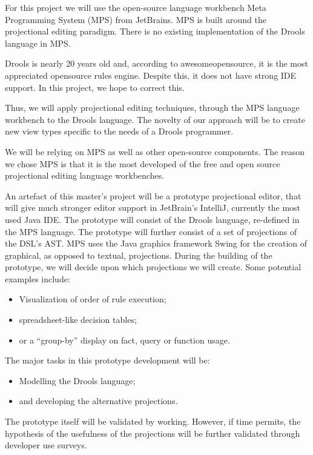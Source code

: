 For this project we will use the open-source language workbench Meta Programming System (MPS) from JetBrains\cite{MPS_ProductPage}.
MPS is built around the projectional editing paradigm.
There is no existing implementation of the Drools language in MPS.

Drools is nearly 20 years old and, according to awesomeopensource\cite{awesomeopensource}, it is the most appreciated opensource rules engine.
Despite this, it does not have strong IDE support.
In this project, we hope to correct this.

Thus, we will apply projectional editing techniques, through the MPS language workbench to the Drools language.
The novelty of our approach will be to create new view types specific to the needs of a Drools programmer.

We will be relying on MPS as well as other open-source components.
The reason we chose MPS is that it is the most developed of the free and open source projectional editing language workbenches\cite{erdweg2013state}.

An artefact of this master's project will be a prototype projectional editor, that will give much stronger editor support in JetBrain's IntelliJ, currently the most used Java IDE\cite{Java_usage_report}.
The prototype will consist of the Drools language, re-defined in the MPS language.  
The prototype will further consist of a set of projections of the DSL's AST.
MPS uses the Java graphics framework Swing for the creation of graphical, as opposed to textual, projections.
During the building of the prototype, we will decide upon which projections we will create. 
Some potential examples include:
\begin{itemize}[topsep=2pt,itemsep=2pt,partopsep=2pt, parsep=2pt]
    \item Visualization of order of rule execution;
    \item spreadsheet-like decision tables;
    \item or a ``group-by'' display on fact, query or function usage.
\end{itemize}

The major tasks in this prototype development will be: 
\begin{itemize}[topsep=2pt,itemsep=2pt,partopsep=2pt, parsep=2pt]
    \item Modelling the Drools language;
    \item and developing the alternative projections.
\end{itemize}

The prototype itself will be validated by working.
However, if time permits, the hypothesis of the usefulness of the projections will be further validated through developer use surveys.

